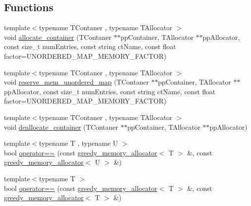 \subsection*{Functions}
\begin{DoxyCompactItemize}
\item 
{\footnotesize template$<$typename T\+Contaner , typename T\+Allocator $>$ }\\void \hyperlink{namespaceuva_1_1utils_1_1containers_1_1alloc_ae65da467dfcf6c2ee5cc8dd2be1ca469}{allocate\+\_\+container} (T\+Contaner $\ast$$\ast$pp\+Container, T\+Allocator $\ast$$\ast$pp\+Allocator, const size\+\_\+t num\+Entries, const string ct\+Name, const float factor=U\+N\+O\+R\+D\+E\+R\+E\+D\+\_\+\+M\+A\+P\+\_\+\+M\+E\+M\+O\+R\+Y\+\_\+\+F\+A\+C\+T\+O\+R)
\item 
{\footnotesize template$<$typename T\+Contaner , typename T\+Allocator $>$ }\\void \hyperlink{namespaceuva_1_1utils_1_1containers_1_1alloc_a59048810604739dc323f29e6a80d88e6}{reserve\+\_\+mem\+\_\+unordered\+\_\+map} (T\+Contaner $\ast$$\ast$pp\+Container, T\+Allocator $\ast$$\ast$pp\+Allocator, const size\+\_\+t num\+Entries, const string ct\+Name, const float factor=U\+N\+O\+R\+D\+E\+R\+E\+D\+\_\+\+M\+A\+P\+\_\+\+M\+E\+M\+O\+R\+Y\+\_\+\+F\+A\+C\+T\+O\+R)
\item 
{\footnotesize template$<$typename T\+Contaner , typename T\+Allocator $>$ }\\void \hyperlink{namespaceuva_1_1utils_1_1containers_1_1alloc_a3da269005cf5338d84a04ea0ac42f673}{deallocate\+\_\+container} (T\+Contaner $\ast$$\ast$pp\+Container, T\+Allocator $\ast$$\ast$pp\+Allocator)
\item 
{\footnotesize template$<$typename T , typename U $>$ }\\bool \hyperlink{namespaceuva_1_1utils_1_1containers_1_1alloc_a2a5f575f106184cf526da77a91dc523a}{operator==} (const \hyperlink{classuva_1_1utils_1_1containers_1_1alloc_1_1greedy__memory__allocator}{greedy\+\_\+memory\+\_\+allocator}$<$ T $>$ \&, const \hyperlink{classuva_1_1utils_1_1containers_1_1alloc_1_1greedy__memory__allocator}{greedy\+\_\+memory\+\_\+allocator}$<$ U $>$ \&)
\item 
{\footnotesize template$<$typename T $>$ }\\bool \hyperlink{namespaceuva_1_1utils_1_1containers_1_1alloc_a6334b250a6461e0534b46180d4889cf4}{operator==} (const \hyperlink{classuva_1_1utils_1_1containers_1_1alloc_1_1greedy__memory__allocator}{greedy\+\_\+memory\+\_\+allocator}$<$ T $>$ \&, const \hyperlink{classuva_1_1utils_1_1containers_1_1alloc_1_1greedy__memory__allocator}{greedy\+\_\+memory\+\_\+allocator}$<$ T $>$ \&)

\end{DoxyCompactItemize}
